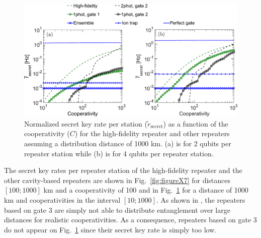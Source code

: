 \begin{figure} [H]
\centering
\includegraphics[width=1\textwidth]{./figs_Borregaard_PRA2015/figureX8.pdf} 
\caption[Optimal secret key rate II]{Normalized secret key rate per station
($\tilde{r}_{\mathrm{secret}}$) as a function of the cooperativity ($C$) for the
high-fidelity repeater and other repeaters assuming a distribution distance of
1000 km. (a) is for 2 qubits per repeater station while (b) is for 4 qubits per
repeater station.}
\label{fig:figureX8}
\end{figure}

The secret key rates per repeater station of the high-fidelity repeater and the
other cavity-based repeaters are shown in Fig.~\ref{fig:figureX7} for distances
$[100;1000]$ km and a cooperativity of 100 and in Fig.~\ref{fig:figureX8} for a
distance of 1000 km and cooperativities in the interval $[10;1000]$. As shown in
, the repeaters based on gate 3 are simply not able to
distribute entanglement over large distances for realistic cooperativities. As a
consequence, repeaters based on gate 3 do not appear on Fig.~\ref{fig:figureX8}
since their secret key rate is simply too low.

